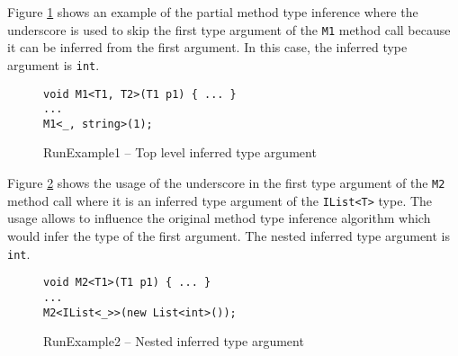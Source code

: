 Figure \ref{img100:example1} shows an example of the partial method type inference where the underscore is used to skip the first type argument of the \texttt{M1} method call because it can be inferred from the first argument.
In this case, the inferred type argument is \texttt{int}.
\begin{figure}[!h]
\begin{lstlisting}[style=csharp, showstringspaces=false]
void M1<T1, T2>(T1 p1) { ... }
...
M1<_, string>(1);
\end{lstlisting}
\caption{RunExample1 -- Top level inferred type argument}
\label{img100:example1}
\end{figure}
\par
Figure \ref{img101:example2} shows the usage of the underscore in the first type argument of the \texttt{M2} method call where it is an inferred type argument of the \texttt{IList<T>} type.
The usage allows to influence the original method type inference algorithm which would infer the type of the first argument.
The nested inferred type argument is \texttt{int}.
\begin{figure}[!h]
\begin{lstlisting}[style=csharp, showstringspaces=false]
void M2<T1>(T1 p1) { ... }
...
M2<IList<_>>(new List<int>());
\end{lstlisting}
\caption{RunExample2 -- Nested inferred type argument}
\label{img101:example2}
\end{figure}

\newpage

